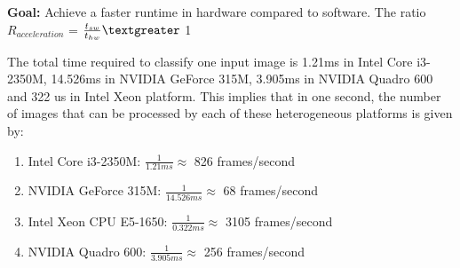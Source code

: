 \textbf{Goal:} Achieve a faster runtime in hardware compared to software.
The ratio $R_{acceleration}$ = $\frac{t_{sw}}{t_{hw}} \textgreater $ 1\newline 
{}
\newline The total time required to classify one input image is 1.21ms in Intel Core i3-2350M, 14.526ms in NVIDIA GeForce 315M, 3.905ms in NVIDIA Quadro 600 and 322 us in Intel Xeon platform. This implies that in one second, the number of images that can be processed by each of these heterogeneous platforms is given by:
\begin{enumerate}
\item Intel Core i3-2350M:  $\frac{1}{1.21ms} \approx$ 826 frames/second
\item NVIDIA GeForce 315M:  $\frac{1}{14.526ms} \approx$ 68 frames/second
\item Intel Xeon CPU E5-1650: $\frac{1}{0.322ms} \approx$ 3105 frames/second
\item NVIDIA Quadro 600: $\frac{1}{3.905ms} \approx$ 256 frames/second
\end{enumerate}

